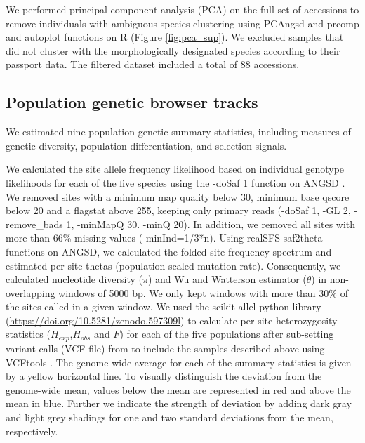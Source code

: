 \documentclass[9pt,twocolumn,twoside]{celabRxiv}
\begin{document}
We performed principal component analysis (PCA) on the full set of accessions to remove individuals with ambiguous species clustering using PCAngsd \citep{meisner2018inferring} and prcomp and autoplot functions on R (Figure \ref{fig:pca_sup}).
We excluded samples that did not cluster with the morphologically designated species according to their passport data. 
The filtered dataset included a total of 88 accessions.

\subsection{Population genetic browser tracks}

We estimated nine population genetic summary statistics, including measures of genetic diversity, population differentiation, and selection signals. 

We calculated the site allele frequency likelihood based on individual genotype likelihoods for each of the five species using the -doSaf 1 function on ANGSD \citep{korneliussen2014angsd}. 
 We removed sites with a minimum map quality below 30, minimum base qscore below 20 and a flagstat \citep{li2009sequence} above 255, keeping only primary reads (-doSaf 1, -GL 2, -remove\_bads 1, -minMapQ 30. -minQ 20).
 In addition, we removed all sites with more than 66\% missing values (-minInd=1/3*n). 
Using realSFS saf2theta functions on ANGSD, we calculated the folded site frequency spectrum and estimated per site thetas (population scaled mutation rate). 
Consequently, we calculated nucleotide diversity ($\pi$) and Wu and Watterson estimator ($\theta$) in non-overlapping windows of 5000 bp. 
We only kept windows with more than 30\% of the sites called in a given window.
We used the scikit-allel python library (\url{https://doi.org/10.5281/zenodo.597309l}) to calculate per site heterozygosity statistics ($H_{exp}$,$H_{obs}$ and $F$) for each of the five populations after sub-setting variant calls (VCF file) from \citet{stetter2020parallel} to include the samples described above using VCFtools \citep{danecek2011variant}.
The genome-wide average for each of the summary statistics is given by a yellow horizontal line.
To visually distinguish the deviation from the genome-wide mean, values below the mean are represented in red and above the mean in blue.
Further we indicate the strength of deviation by adding dark gray and light grey shadings for one and two standard deviations from the mean, respectively.
\end{document}
